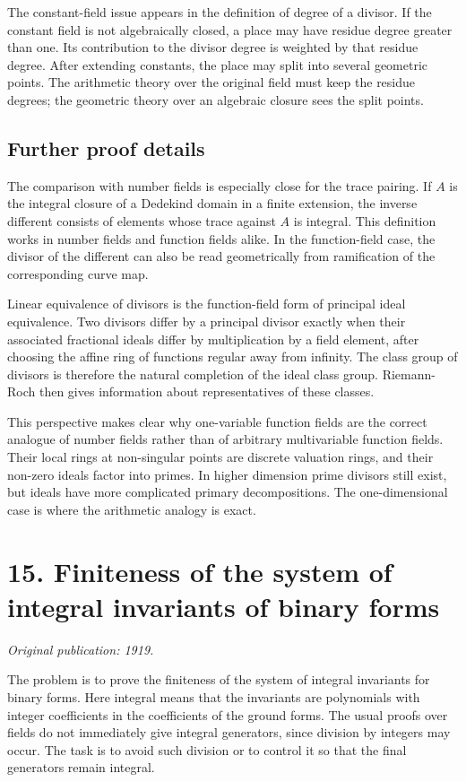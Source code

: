 \documentclass[11pt]{article}
\begin{document}
The constant-field issue appears in the definition of degree of a divisor. If the constant field is
not algebraically closed, a place may have residue degree greater than one. Its contribution to the
divisor degree is weighted by that residue degree. After extending constants, the place may split
into several geometric points. The arithmetic theory over the original field must keep the residue
degrees; the geometric theory over an algebraic closure sees the split points.


\subsection{Further proof details}

The comparison with number fields is especially close for the trace pairing. If \(A\) is the
integral closure of a Dedekind domain in a finite extension, the inverse different consists of
elements whose trace against \(A\) is integral. This definition works in number fields and function
fields alike. In the function-field case, the divisor of the different can also be read
geometrically from ramification of the corresponding curve map.

Linear equivalence of divisors is the function-field form of principal ideal equivalence. Two
divisors differ by a principal divisor exactly when their associated fractional ideals differ by
multiplication by a field element, after choosing the affine ring of functions regular away from
infinity. The class group of divisors is therefore the natural completion of the ideal class group.
Riemann-Roch then gives information about representatives of these classes.

This perspective makes clear why one-variable function fields are the correct analogue of number
fields rather than of arbitrary multivariable function fields. Their local rings at non-singular
points are discrete valuation rings, and their non-zero ideals factor into primes. In higher
dimension prime divisors still exist, but ideals have more complicated primary decompositions. The
one-dimensional case is where the arithmetic analogy is exact.


\section{15. Finiteness of the system of integral invariants of binary forms}

\textit{Original publication: 1919.}

The problem is to prove the finiteness of the system of integral invariants for binary forms. Here
integral means that the invariants are polynomials with integer coefficients in the coefficients of
the ground forms. The usual proofs over fields do not immediately give integral generators, since
division by integers may occur. The task is to avoid such division or to control it so that the
final generators remain integral.
\end{document}
